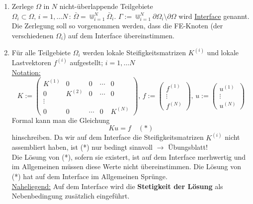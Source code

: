 \begin{enumerate}
\item
Zerlege $\Omega$ in $N$ nicht-überlappende Teilgebiete $\Omega_i \subset \Omega,\, i=1,\dots N \, : \, \bar \Omega = \Cup_{i=1}^N \bar \Omega_i $. $ \Gamma := \Cup_{i=1}^N \partial \Omega_i \setminus \partial \Omega$ wird \underline{Interface} genannt.\\
Die Zerlegung soll so vorgenommen werden, dass die FE-Knoten (der verschiedenen $\Omega_i$) auf dem Interface übereinstimmen.
\item
Für alle Teilgebiete $\Omega_i$ werden lokale Steifigkeitsmatrizen $K^{(i)}$ und lokale Lastvektoren $f^{(i)}$ aufgestellt; $i=1,\dots N$\\
\underline{Notation:}
\[ K:= \begin{pmatrix}  K^{(1)} & 0 & 0 & \cdots & 0 \\
				0 & K^{(2)}   & 0 & \cdots  &0 \\
				\vdots\\
				 0 & 0 & \cdots & 0 & K^{(N)}
	\end{pmatrix}, \,
  f:= \begin{pmatrix} f^{(1)} \\ \vdots \\ f^{(N)} \end{pmatrix}, \, u:=  \begin{pmatrix} u^{(1)} \\ \vdots \\ u^{(N)} \end{pmatrix}
\]
Formal kann man die Gleichung 
\begin{equation}
Ku=f \quad (*)
\end{equation}
hinschreiben. Da wir auf dem Interface die Steifigkeitsmatrizen $K^{(i)}$ nicht assembliert haben, ist (*) nur bedingt sinnvoll $\rightarrow$ Übungsblatt!\\
Die Lösung von (*), sofern sie existert, ist auf dem Interface merhwertig und im Allgemeinen müssen diese Werte nicht übereinstimmen. Die Lösung von (*) hat auf dem Interface im Allgemeinen Sprünge.\\
\underline{Naheliegend:} Auf dem Interface wird die \textbf{Stetigkeit der Lösung} als Nebenbedingung zusätzlich eingeführt.



\end{enumerate}
